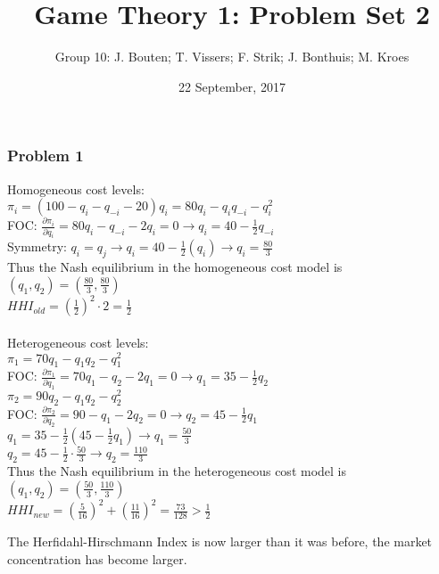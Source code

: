 \documentclass[a4paper]{article}
\author{Group 10: J. Bouten; T. Vissers; F. Strik; J. Bonthuis; M. Kroes}
\date{22 September, 2017}
\title{Game Theory 1: Problem Set 2}
\begin{document}
\maketitle

\subsubsection{Problem 1}\label{problem1}

Homogeneous cost levels:\\
$\pi_i=(100-q_i-q_{-i}-20)q_i=80q_i-q_iq_{-i}-q_i^2$\\ 
FOC: $\frac{\partial\pi_i}{\partial q_i}=80q_i-q_{-i}-2q_i=0 \rightarrow q_i=40-\frac{1}{2}q_{-i}$\\
Symmetry: $q_i=q_j \rightarrow q_i=40-\frac{1}{2}(q_i)  \rightarrow q_i=\frac{80}{3}$
\\ 
Thus the Nash equilibrium in the homogeneous cost model is $(q_1,q_2)=(\frac{80}{3},\frac{80}{3})$
\\ $HHI_{old}=\left(\frac{1}{2}\right)^2\cdot2=\frac{1}{2}$\\ \\
Heterogeneous cost levels: \\ $\pi_1=70q_1-q_1q_2-q_1^2$\\
FOC: $\frac{\partial\pi_1}{\partial q_1}=70q_1-q_2-2q_1=0 \rightarrow q_1=35-\frac{1}{2}q_2 $\\
$\pi_2=90q_2-q_1q_2-q_2^2$\\
FOC: $\frac{\partial\pi_2}{\partial q_2}=90-q_1-2q_2=0 \rightarrow q_2=45-\frac{1}{2}q_1$\\
$q_1=35-\frac{1}{2}(45-\frac{1}{2}q_1) \rightarrow q_1=\frac{50}{3}$\\
$q_2=45-\frac{1}{2}\cdot\frac{50}{3} \rightarrow q_2=\frac{110}{3}$\\
Thus the Nash equilibrium in the heterogeneous cost model is $(q_1,q_2)=(\frac{50}{3},\frac{110}{3})$\\
$HHI_{new}=\left(\frac{5}{16}\right)^2+\left(\frac{11}{16}\right)^2=\frac{73}{128}>\frac{1}{2}$

The Herfidahl-Hirschmann Index is now larger than it was before, the market concentration has become larger. 
\end{document}
